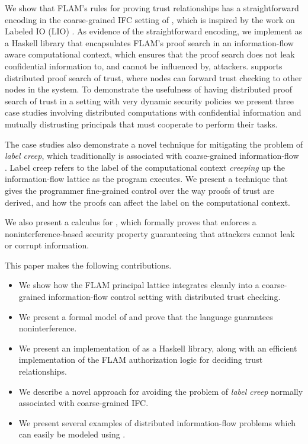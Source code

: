 We show that FLAM's rules for proving trust relationships has a straightforward encoding in the coarse-grained IFC setting of \lang{}, which is inspired by the work on Labeled IO (LIO) \cite{SRMMlio}. As evidence of the straightforward encoding, we implement \lang{} as a Haskell library that encapsulates FLAM's proof search in an information-flow aware computational context, which ensures that the proof search does not leak confidential information to, and cannot be influenced by, attackers. \lang{} supports distributed proof search of trust, where nodes can forward trust checking to other nodes in the system. To demonstrate the usefulness of having distributed proof search of trust in a setting with very dynamic security policies we present three case studies involving distributed computations with confidential information and mutually distrusting principals that must cooperate to perform their tasks.

The case studies also demonstrate a novel technique for mitigating the problem of \emph{label creep}, which traditionally is associated with coarse-grained information-flow \cite{SRMMlio}. Label creep refers to the label of the computational context \emph{creeping} up the information-flow lattice as the program executes. We present a technique that gives the programmer fine-grained control over the way proofs of trust are derived, and how the proofs can affect the label on the computational context.

We also present a calculus for \lang{}, which formally proves that \lang{} enforces a noninterference-based \cite{6234468} security property guaranteeing that attackers cannot leak or corrupt information.

This paper makes the following contributions.
\begin{itemize}
    \item We show how the FLAM principal lattice integrates cleanly into a coarse-grained information-flow control setting with distributed trust checking.
    \item We present a formal model of \lang{} and prove that the language guarantees noninterference.
    \item We present an implementation of \lang{} as a Haskell library, along with an efficient implementation of the FLAM authorization logic for deciding trust relationships.
    \item We describe a novel approach for avoiding the problem of \emph{label creep} normally associated with coarse-grained IFC.
    \item We present several examples of distributed information-flow problems which can easily be modeled using \lang.
\end{itemize}


